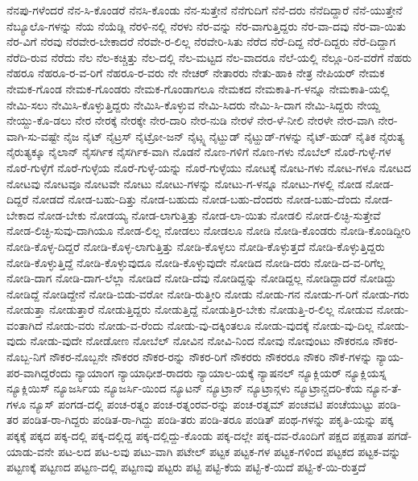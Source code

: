 {ನೆನಪು-ಗಳೆಂದರೆ
ನೆನ-ಸಿ-ಕೊಂಡರೆ
ನೆನಸಿ-ಕೊಂಡು
ನೆನ-ಸುತ್ತೇನೆ
ನೆನೆಗುದಿಗೆ
ನೆನೆ-ದರು
ನೆನೆದಿದ್ದಾರೆ
ನೆನೆ-ಯುತ್ತೇನೆ
ನೆಬ್ಯೂಲೊ-ಗಳನ್ನು
ನೆಯ
ನೆಯೆಡ್ಲಿ
ನೆರಳಿ-ನಲ್ಲಿ
ನೆರಳು
ನೆರ-ವನ್ನು
ನೆರ-ವಾಗುತ್ತಿದ್ದರು
ನೆರ-ವಾ-ದವು
ನೆರ-ವಾ-ಯಿತು
ನೆರ-ವಿಗೆ
ನೆರವು
ನೆರವೇರ-ಬೇಕಾದರೆ
ನೆರವೇ-ರ-ಲಿಲ್ಲ
ನೆರವೇರಿ-ಸಿತು
ನೆರೆದ
ನೆರೆ-ದಿದ್ದ
ನೆರೆ-ದಿದ್ದರು
ನೆರೆ-ದಿದ್ದಾಗ
ನೆರೆದಿ-ರುವ
ನೆರೆದು
ನೆಲ
ನೆಲ-ಕಚ್ಚಿತ್ತು
ನೆಲ-ದಲ್ಲಿ
ನೆಲ-ಮಟ್ಟದ
ನೆಲ-ವಾದರೂ
ನೆಲೆ-ಯಲ್ಲಿ
ನೆಲ್ಲೂ-ರಿನ-ವರೆಗೆ
ನೆಹರು
ನೆಹರೂ
ನೆಹರೂ-ರ-ವ-ರಿಗೆ
ನೆಹರೂ-ರ-ವರು
ನೇ
ನೇಚರ್
ನೇತಾರರು
ನೇತು-ಹಾಕಿ
ನೇತ್ರ
ನೇಪಿಯರ್
ನೇಮಕ
ನೇಮಕ-ಗೊಂಡ
ನೇಮಕ-ಗೊಂಡರು
ನೇಮಕ-ಗೊಂಡಾಗಲೂ
ನೇಮಕದ
ನೇಮಕಾತಿ-ಗ-ಳನ್ನೂ
ನೇಮಕಾತಿ-ಯಲ್ಲಿ
ನೇಮಿ-ಸಲು
ನೇಮಿಸಿ-ಕೊಳ್ಳುತ್ತಿದ್ದರು
ನೇಮಿಸಿ-ಕೊಳ್ಳುವ
ನೇಮಿ-ಸಿದರು
ನೇಮಿ-ಸಿ-ದಾಗ
ನೇಮಿ-ಸಿದ್ದರು
ನೇಯ್ದ
ನೇಯ್ದು-ಕೊ-ಡಲು
ನೇರ
ನೇರಕ್ಕೆ
ನೇರಕ್ಕೇ
ನೇರ-ದಾರಿ
ನೇರ-ನುಡಿ
ನೇರಳೆ
ನೇರ-ಳೆ-ನೀಲಿ
ನೇರಳೇ
ನೇರ-ವಾಗಿ
ನೇರ-ವಾಗಿ-ಸು-ವಷ್ಟೇ
ನೈಜ
ನೈಟ್
ನೈಟ್ರಸ್
ನೈಟ್ರೋ-ಜನ್
ನೈಟ್ಸ್ನ
ನೈಟ್ಹುಡ್
ನೈಟ್ಹುಡ್-ಗಳನ್ನು
ನೈಟ್-ಹುಡ್
ನೈತಿಕ
ನೈರುತ್ಯ
ನೈರುತ್ಯಕ್ಕೂ
ನೈಲಾನ್
ನೈಸರ್ಗಿಕ
ನೈಸರ್ಗಿಕ-ವಾಗಿ
ನೊಡನೆ
ನೊಣ-ಗಳಿಗೆ
ನೊಣ-ಗಳು
ನೊಬೆಲ್
ನೊರೆ-ಗುಳ್ಳೆ-ಗಳ
ನೊರೆ-ಗುಳ್ಳೆಗೆ
ನೊರೆ-ಗುಳ್ಳೆಯ
ನೊರೆ-ಗುಳ್ಳೆ-ಯನ್ನು
ನೊರೆ-ಗುಳ್ಳೆಯು
ನೋಟಕ್ಕೆ
ನೋಟ-ಗಳು
ನೋಟ-ಗಳೂ
ನೋಟದ
ನೋಟವು
ನೋಟವೂ
ನೋಟವೇ
ನೋಟು
ನೋಟು-ಗಳನ್ನು
ನೋಟು-ಗ-ಳನ್ನೂ
ನೋಟು-ಗಳಲ್ಲಿ
ನೋಡ
ನೋಡ-ದಿದ್ದರೆ
ನೋಡದೆ
ನೋಡ-ಬಹು-ದಿತ್ತು
ನೋಡ-ಬಹುದು
ನೋಡ-ಬಹು-ದೆಂದರು
ನೋಡ-ಬಹು-ದೆಂದು
ನೋಡ-ಬೇಕಾದ
ನೋಡ-ಬೇಕು
ನೋಡಯ್ಯ
ನೋಡ-ಲಾಗುತ್ತಿತ್ತು
ನೋಡ-ಲಾ-ಯಿತು
ನೋಡಲಿ
ನೋಡ-ಲಿಚ್ಛಿ-ಸುತ್ತೇವೆ
ನೋಡ-ಲಿಚ್ಛಿ-ಸುವು-ದಾಗಿಯೂ
ನೋಡ-ಲಿಲ್ಲ
ನೋಡಲು
ನೋಡಲೂ
ನೋಡಿ
ನೋಡಿ-ಕೊಂಡರು
ನೋಡಿ-ಕೊಂಡಿದ್ದೀರಿ
ನೋಡಿ-ಕೊಳ್ಳ-ದಿದ್ದರೆ
ನೋಡಿ-ಕೊಳ್ಳ-ಲಾಗುತ್ತಿತ್ತು
ನೋಡಿ-ಕೊಳ್ಳಲು
ನೋಡಿ-ಕೊಳ್ಳುತ್ತದೆ
ನೋಡಿ-ಕೊಳ್ಳುತ್ತಿದ್ದರು
ನೋಡಿ-ಕೊಳ್ಳುತ್ತಿದ್ದೆ
ನೋಡಿ-ಕೊಳ್ಳುವುದೂ
ನೋಡಿ-ಕೊಳ್ಳುವುದೇ
ನೋಡಿದ
ನೋಡಿ-ದರು
ನೋಡಿ-ದ-ವ-ರಿಗೆಲ್ಲ
ನೋಡಿ-ದಾಗ
ನೋಡಿ-ದಾಗ-ಲೆಲ್ಲಾ
ನೋಡಿದೆ
ನೋಡಿ-ದೆವು
ನೋಡಿದ್ದನ್ನು
ನೋಡಿದ್ದಲ್ಲ
ನೋಡಿದ್ದಾದರೆ
ನೋಡಿದ್ದು
ನೋಡಿದ್ದೆ
ನೋಡಿದ್ದೇನೆ
ನೋಡಿ-ಬಿಡು-ವರೋ
ನೋಡಿ-ರುತ್ತೀರಿ
ನೋಡು
ನೋಡು-ಗನ
ನೋಡು-ಗ-ರಿಗೆ
ನೋಡು-ಗರು
ನೋಡುತ್ತಾ
ನೋಡುತ್ತಾರೆ
ನೋಡುತ್ತಿದ್ದರು
ನೋಡುತ್ತಿದ್ದೆ
ನೋಡುತ್ತಿರ-ಬೇಕು
ನೋಡುತ್ತಿ-ರ-ಲಿಲ್ಲ
ನೋಡುವ
ನೋಡು-ವಂತಾಗಿದೆ
ನೋಡು-ವರು
ನೋಡು-ವ-ರೆಂದು
ನೋಡು-ವು-ದಕ್ಕಿಂತಲೂ
ನೋಡು-ವುದಕ್ಕೆ
ನೋಡು-ವು-ದಿಲ್ಲ
ನೋಡು-ವುದು
ನೋಡು-ವುದೇ
ನೋಡೋಣ
ನೋಬೆಲ್
ನೋವಿನ
ನೋವಿ-ನಿಂದ
ನೋವು
ನೋವುಂಟು
ನೌಕರನೂ
ನೌಕರ-ನೊಬ್ಬ-ನಿಗೆ
ನೌಕರ-ನೊಬ್ಬನೇ
ನೌಕರರ
ನೌಕರ-ರನ್ನು
ನೌಕರ-ರಿಗೆ
ನೌಕರರು
ನೌಕರರೂ
ನೌಕರಿ
ನೌಕೆ-ಗಳನ್ನು
ನ್ಯಾಯ-ಪರ-ವಾಗಿದ್ದರೆಂದು
ನ್ಯಾಯಾಂಗ
ನ್ಯಾಯಾಧೀಶ-ರಾದರು
ನ್ಯಾಯಾಲ-ಯಕ್ಕೆ
ನ್ಯಾಷನಲ್
ನ್ಯೂಕ್ಲಿಯರ್
ನ್ಯೂಕ್ಲಿಯಸ್ನ
ನ್ಯೂಕ್ಲಿಯಿಸ್
ನ್ಯೂಜರ್ಸಿಯ
ನ್ಯೂಜರ್ಸಿ-ಯಿಂದ
ನ್ಯೂಟನ್
ನ್ಯೂಟ್ರಾನ್
ನ್ಯೂಟ್ರಾನ್ಗಳು
ನ್ಯೂಟ್ರಾನ್ಚದರಿ-ಕೆಯ
ನ್ಯೂನ-ತೆ-ಗಳೂ
ನ್ಯೂಸ್
ಪಂಗಡ-ದಲ್ಲಿ
ಪಂಚ-ರತ್ನಂ
ಪಂಚ-ರತ್ನಂರವ-ರನ್ನು
ಪಂಚ-ರತ್ನಮ್
ಪಂಚವಟಿ
ಪಂಚೆಯುಟ್ಟು
ಪಂಡಿ-ತರ
ಪಂಡಿತ-ರಾ-ಗಿದ್ದರು
ಪಂಡಿತ-ರಾ-ಗಿದ್ದು
ಪಂಡಿ-ತರು
ಪಂಡಿ-ತರೂ
ಪಂಡಿತ್
ಪಂಥ-ಗಳನ್ನು
ಪಕೃತಿ-ಯನ್ನು
ಪಕ್ಕ
ಪಕ್ಕಕ್ಕೆ
ಪಕ್ಕದ
ಪಕ್ಕ-ದಲ್ಲಿ
ಪಕ್ಕ-ದಲ್ಲಿದ್ದ
ಪಕ್ಕ-ದಲ್ಲಿದ್ದು-ಕೊಂಡು
ಪಕ್ಕ-ದಲ್ಲೇ
ಪಕ್ಕ-ದವ-ರೊಂದಿಗೆ
ಪಕ್ಷದ
ಪಕ್ಷಪಾತ
ಪಗಡೆ-ಯಾಡು-ವನೇ
ಪಟ-ಲದ
ಪಟ-ಲವು
ಪಟು-ವಾಗಿ
ಪಟೇಲ್
ಪಟ್ಟಕ
ಪಟ್ಟಕ-ಗಳ
ಪಟ್ಟಕ-ಗಳಿಂದ
ಪಟ್ಟಕದ
ಪಟ್ಟಕ-ವನ್ನು
ಪಟ್ಟಣಕ್ಕೆ
ಪಟ್ಟಣದ
ಪಟ್ಟಣ-ದಲ್ಲಿ
ಪಟ್ಟಣವು
ಪಟ್ಟರು
ಪಟ್ಟಿ
ಪಟ್ಟಿ-ಕೆಯ
ಪಟ್ಟಿ-ಕೆ-ಯಿದೆ
ಪಟ್ಟಿ-ಕೆ-ಯಿ-ರುತ್ತದೆ
}
